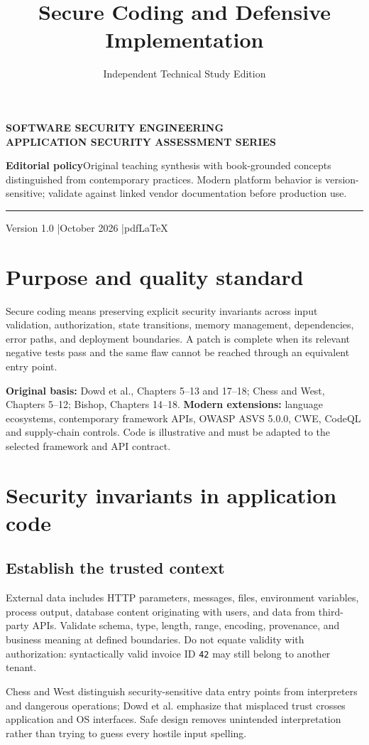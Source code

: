 \documentclass[
  letterpaper,
]{article}
\title{Secure Coding and Defensive Implementation}
\author{Independent Technical Study Edition}
\date{}
\makeatletter
\renewcommand{\maketitle}{%
 \hypersetup{pageanchor=false}%
\begin{titlepage}\thispagestyle{empty}
 \vspace*{1.5cm}{\color{brand}\rule{\textwidth}{3pt}}\par\vspace{1cm}
 {\sffamily\bfseries\color{muted}\large SOFTWARE SECURITY ENGINEERING\\ APPLICATION SECURITY ASSESSMENT SERIES}\par\vspace{1.05cm}
 {\sffamily\bfseries\color{ink}\fontsize{27}{34}\selectfont\@title\par}\vspace{0.8cm}
 {\sffamily\large\color{brand}\@author\par}\vfill
 \begin{tcolorbox}[colback=brandlight,colframe=brand!55,boxrule=0.5pt]
 \small\textbf{Editorial policy}\quad Original teaching synthesis with book-grounded concepts distinguished from contemporary practices. Modern platform behavior is version-sensitive; validate against linked vendor documentation before production use.
 \end{tcolorbox}
 {\color{brand}\rule{\textwidth}{2pt}}\par\vspace{0.3cm}
 {\sffamily\small Version 1.0 \quad|\quad October 2026 \quad|\quad pdfLaTeX}\end{titlepage}\hypersetup{pageanchor=true}\setcounter{page}{1}}
\makeatother
\begin{document}
\maketitle

{
\setcounter{tocdepth}{3}
\tableofcontents
}
\section{Purpose and quality
standard}\label{purpose-and-quality-standard}

Secure coding means preserving explicit security invariants across input
validation, authorization, state transitions, memory management,
dependencies, error paths, and deployment boundaries. A patch is
complete when its relevant negative tests pass and the same flaw cannot
be reached through an equivalent entry point.

\textbf{Original basis:} Dowd et al., Chapters 5--13 and 17--18; Chess
and West, Chapters 5--12; Bishop, Chapters 14--18. \textbf{Modern
extensions:} language ecosystems, contemporary framework APIs, OWASP
ASVS 5.0.0, CWE, CodeQL and supply-chain controls. Code is illustrative
and must be adapted to the selected framework and API contract.

\section{Security invariants in application
code}\label{security-invariants-in-application-code}

\subsection{Establish the trusted
context}\label{establish-the-trusted-context}

External data includes HTTP parameters, messages, files, environment
variables, process output, database content originating with users, and
data from third-party APIs. Validate schema, type, length, range,
encoding, provenance, and business meaning at defined boundaries. Do not
equate validity with authorization: syntactically valid invoice ID
\texttt{42} may still belong to another tenant.

\begin{sourceconcept}
Chess and West distinguish security-sensitive data entry points from interpreters and dangerous operations; Dowd et al. emphasize that misplaced trust crosses application and OS interfaces. Safe design removes unintended interpretation rather than trying to guess every hostile input spelling.
\end{sourceconcept}
\end{document}
